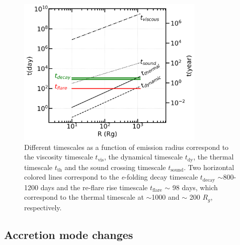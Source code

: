 \documentclass[twocolumn]{aastex63}
\begin{document}
\begin{figure}
\centering
	\includegraphics[width=0.8\textwidth]{./pic/Mrk1018_timescale_withR.png}
    \caption{Different timescales as a function of emission radius correspond to the viscosity timescale $t_\mathrm{vis}$, the dynamical timescale $t_\mathrm{dy}$, the thermal timescale $t_\mathrm{th}$ and the sound crossing timescale $t_\mathrm{sound}$. Two horizontal colored lines correspond to the \textit{e}-folding decay timescale $t_\mathrm{decay}$ $\sim$800-1200 days and the re-flare rise timescale $t_\mathrm{flare}$ $\sim$ 98 days, which correspond to the thermal timescale at $\sim$1000 and $\sim$ 200 $R_g$, respectively.}
    \label{fig:timescale}
\end{figure}


\subsection{Accretion mode changes}
\label{sec:spectral evolution}
\end{document}
